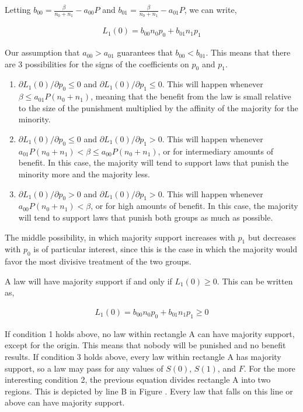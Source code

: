 Letting $b_{00} = \frac{\beta }{n_0 + n_1} -  a_{00}P $ and $b_{01} = \frac{\beta}{n_0 + n_1} -   a_{01}P $, we can write,

\begin{align}
L_1(0) = b_{00}n_0p_0 + b_{01} n_1p_1 
\end{align}

Our assumption that $a_{00} > a_{01}$ guarantees that $b_{00} < b_{01}$.  This means that there are 3 possibilities for the signs of the coefficients on $p_0$ and $p_1$.

\begin{enumerate}
\item $\partial L_1(0) / \partial p_0 \leq 0$ and $\partial L_1(0) / \partial p_1 \leq 0$.  This will happen whenever $\beta \leq   a_{01}P(n_0 + n_1)  $, meaning that the benefit from the law is small relative to the size of the punishment multiplied by the affinity of the majority for the minority.
\item $\partial L_1(0) / \partial p_0 \leq 0$ and $\partial L_1(0) / \partial p_1 > 0$.  This will happen whenever $  a_{01}P(n_0 + n_1) < \beta  \leq a_{00}P(n_0 + n_1) $, or for intermediary amounts of benefit.  In this case, the majority will tend to support laws that punish the minority more and the majority less.
\item $\partial L_1(0) / \partial p_0 > 0$ and $\partial L_1(0) / \partial p_1 > 0$.  This will happen whenever $   a_{00}P(n_0 + n_1) < \beta$, or for high amounts of benefit.  In this case, the majority will tend to support laws that punish both groups as much as possible.
\end{enumerate}

The middle possibility, in which majority support increases with $p_1$ but decreases with $p_0$ is of particular interest, since this is the case in which the majority would favor the most divisive treatment of the two groups.

A law will have majority support if and only if $L_1(0) \geq 0$.  This can be written as,

\begin{align}
L_1(0) = b_{00}n_0p_0 + b_{01} n_1p_1 \geq 0
\end{align}

If condition 1 holds above, no law within rectangle A can have majority support, except for the origin.  This means that nobody will be punished and no benefit results.  If condition 3 holds above, every law within rectangle A has majority support, so a law may pass for any values of $S(0)$, $S(1)$, and $F$.  For the more interesting condition 2, the previous equation divides rectangle A into two regions.  This is depicted by line B in Figure .  Every law that falls on this line or above can have majority support.

